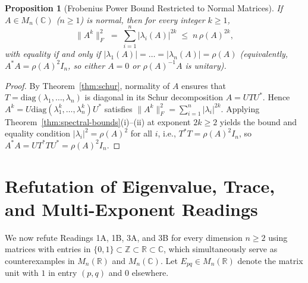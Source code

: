 \documentclass[11pt,a4paper]{article}
\theoremstyle{plain}
\newtheorem{proposition}[theorem]{Proposition}
\theoremstyle{definition}
\newcommand{\C}{\mathbb{C}}
\newcommand{\R}{\mathbb{R}}
\newcommand{\Z}{\mathbb{Z}}
\newcommand{\diag}{\mathrm{diag}}
\begin{document}
\begin{proposition}[Frobenius Power Bound Restricted to Normal Matrices]\label{prop:normal-frob}
If $A \in M_n(\C)$ ($n \ge 1$) is normal, then for every integer $k \ge 1$,
\[
  \|A^k\|_F^2 \;=\; \sum_{i=1}^n |\lambda_i(A)|^{2k} \;\le\; n\,\rho(A)^{2k},
\]
with equality if and only if $|\lambda_1(A)| = \dots = |\lambda_n(A)| = \rho(A)$ (equivalently, $A^* A = \rho(A)^2 I_n$, so either $A = 0$ or $\rho(A)^{-1} A$ is unitary).
\end{proposition}

\begin{proof}
By Theorem~\ref{thm:schur}, normality of $A$ ensures that $T = \diag(\lambda_1, \dots, \lambda_n)$ is diagonal in its Schur decomposition $A = U T U^*$. Hence $A^k = U \diag(\lambda_1^k, \dots, \lambda_n^k) U^*$ satisfies $\|A^k\|_F^2 = \sum_{i=1}^n |\lambda_i|^{2k}$. Applying Theorem~\ref{thm:spectral-bounds}(i)--(ii) at exponent $2k \ge 2$ yields the bound and equality condition $|\lambda_i|^2 = \rho(A)^2$ for all $i$, i.e., $T^* T = \rho(A)^2 I_n$, so $A^* A = U T^* T U^* = \rho(A)^2 I_n$.
\end{proof}

\section{Refutation of Eigenvalue, Trace, and Multi-Exponent Readings}

We now refute Readings 1A, 1B, 3A, and 3B for every dimension $n \ge 2$ using matrices with entries in $\{0,1\} \subset \Z \subset \R \subset \C$, which simultaneously serve as counterexamples in $M_n(\R)$ and $M_n(\C)$. Let $E_{pq} \in M_n(\R)$ denote the matrix unit with $1$ in entry $(p,q)$ and $0$ elsewhere.
\end{document}
